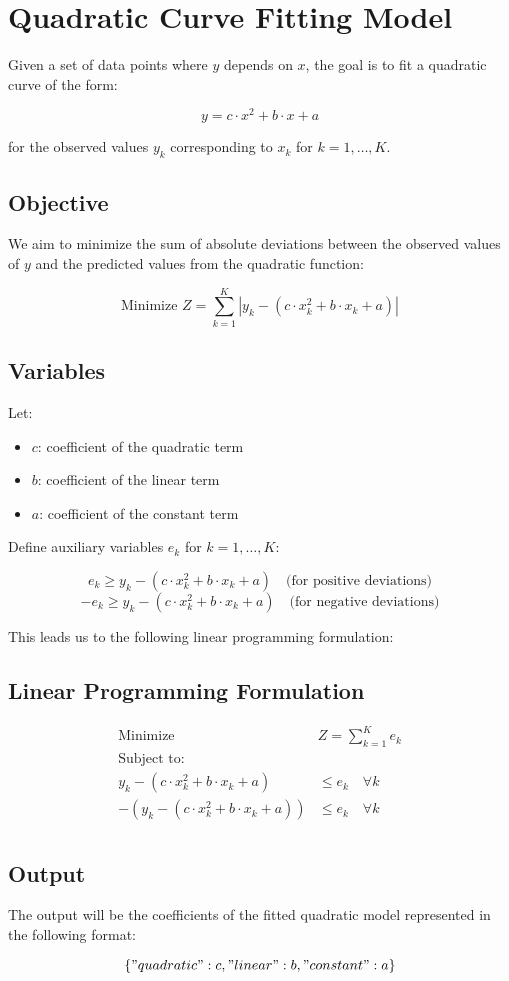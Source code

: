 \documentclass{article}
\begin{document}
\section*{Quadratic Curve Fitting Model}

Given a set of data points where \( y \) depends on \( x \), the goal is to fit a quadratic curve of the form:

\[
y = c \cdot x^2 + b \cdot x + a
\]

for the observed values \( y_k \) corresponding to \( x_k \) for \( k = 1, \ldots, K \).

\subsection*{Objective}

We aim to minimize the sum of absolute deviations between the observed values of \( y \) and the predicted values from the quadratic function:

\[
\text{Minimize } Z = \sum_{k=1}^{K} |y_k - (c \cdot x_k^2 + b \cdot x_k + a)|
\]

\subsection*{Variables}

Let:
\begin{itemize}
    \item \( c \): coefficient of the quadratic term
    \item \( b \): coefficient of the linear term
    \item \( a \): coefficient of the constant term
\end{itemize}

Define auxiliary variables \( e_k \) for \( k = 1, \ldots, K \):

\[
e_k \geq y_k - (c \cdot x_k^2 + b \cdot x_k + a) \quad \text{(for positive deviations)}
\]
\[
-e_k \geq y_k - (c \cdot x_k^2 + b \cdot x_k + a) \quad \text{(for negative deviations)}
\]

This leads us to the following linear programming formulation:

\subsection*{Linear Programming Formulation}

\begin{align*}
\text{Minimize } & Z = \sum_{k=1}^{K} e_k \\
\text{Subject to:} & \\
y_k - (c \cdot x_k^2 + b \cdot x_k + a) & \leq e_k \quad \forall k \\
-(y_k - (c \cdot x_k^2 + b \cdot x_k + a)) & \leq e_k \quad \forall k \\
\end{align*}

\subsection*{Output}

The output will be the coefficients of the fitted quadratic model represented in the following format:

\[
\{
    "quadratic": c,
    "linear": b,
    "constant": a
\}
\]
\end{document}
